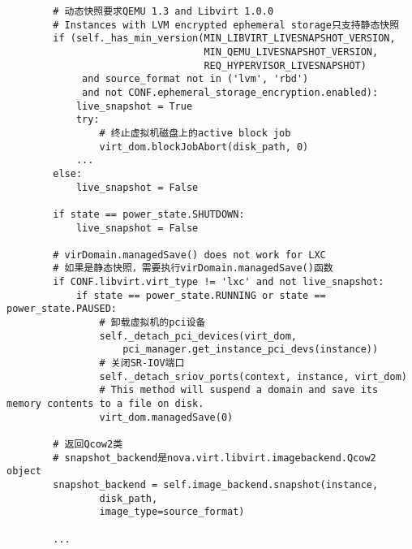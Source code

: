 \documentclass[a4paper,left=1.5cm,right=1.5cm,11pt]{article}
\begin{document}
\begin{lstlisting}
        # 动态快照要求QEMU 1.3 and Libvirt 1.0.0
        # Instances with LVM encrypted ephemeral storage只支持静态快照
        if (self._has_min_version(MIN_LIBVIRT_LIVESNAPSHOT_VERSION,
                                  MIN_QEMU_LIVESNAPSHOT_VERSION,
                                  REQ_HYPERVISOR_LIVESNAPSHOT)
             and source_format not in ('lvm', 'rbd')
             and not CONF.ephemeral_storage_encryption.enabled):
            live_snapshot = True
            try:
                # 终止虚拟机磁盘上的active block job
                virt_dom.blockJobAbort(disk_path, 0)
            ...
        else:
            live_snapshot = False

        if state == power_state.SHUTDOWN:
            live_snapshot = False

        # virDomain.managedSave() does not work for LXC
        # 如果是静态快照，需要执行virDomain.managedSave()函数
        if CONF.libvirt.virt_type != 'lxc' and not live_snapshot:
            if state == power_state.RUNNING or state == power_state.PAUSED:
                # 卸载虚拟机的pci设备
                self._detach_pci_devices(virt_dom,
                    pci_manager.get_instance_pci_devs(instance))
                # 关闭SR-IOV端口
                self._detach_sriov_ports(context, instance, virt_dom)
                # This method will suspend a domain and save its memory contents to a file on disk.
                virt_dom.managedSave(0)
            
        # 返回Qcow2类
        # snapshot_backend是nova.virt.libvirt.imagebackend.Qcow2 object
        snapshot_backend = self.image_backend.snapshot(instance,
                disk_path,
                image_type=source_format)

        ...


\end{lstlisting}
\end{document}
